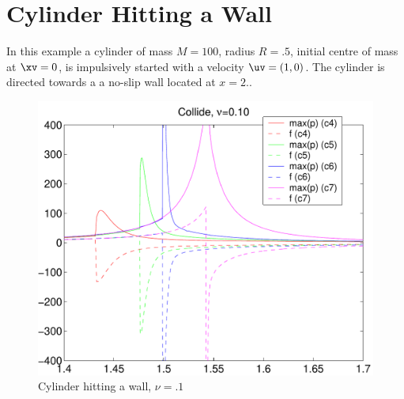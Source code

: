 \section{Cylinder Hitting a Wall} \label{sec:cylHittingWall}

In this example a cylinder of mass $M=100$, radius $R=.5$, initial centre of mass at $\xv=0$,
is impulsively started with a velocity $\uv=(1,0)$. The cylinder is directed towards a
a no-slip wall located at $x=2.$. 

{
\newcommand{\figWidth}{.75\linewidth}
\begin{figure}
\begin{center}
%
\includegraphics[width=\figWidth]{figures/collide-nu0p1}  
%
\end{center}
\caption{Cylinder hitting a wall, $\nu=.1$} 
\end{figure}
}


